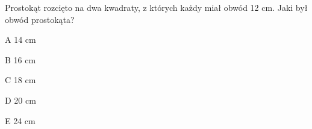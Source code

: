 \begin{tresc}
Prostokąt rozcięto na dwa kwadraty, z których każdy miał obwód 12 cm. Jaki był obwód prostokąta?
\end{tresc}
\begin{wariant}{A} 14 cm \end{wariant}
\begin{wariant}{B} 16 cm \end{wariant}
\begin{wariant}{C} 18 cm \end{wariant}
\begin{wariant}{D} 20 cm \end{wariant}
\begin{wariant}{E} 24 cm \end{wariant}
